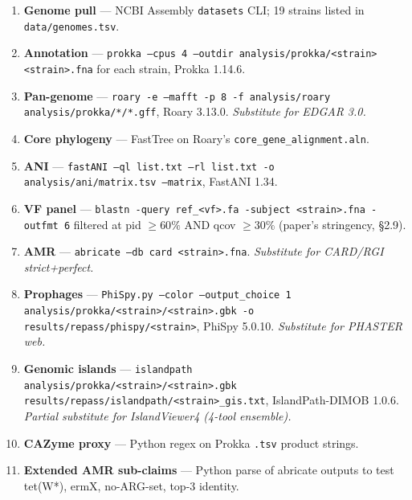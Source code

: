 \documentclass[11pt,a4paper]{article}
\begin{document}
\begin{enumerate}
\item \textbf{Genome pull} --- NCBI Assembly \texttt{datasets} CLI; 19 strains listed in \texttt{data/genomes.tsv}.
\item \textbf{Annotation} --- \texttt{prokka --cpus 4 --outdir analysis/prokka/<strain> <strain>.fna} for each strain, Prokka 1.14.6.
\item \textbf{Pan-genome} --- \texttt{roary -e --mafft -p 8 -f analysis/roary analysis/prokka/*/*.gff}, Roary 3.13.0. \emph{Substitute for EDGAR 3.0.}
\item \textbf{Core phylogeny} --- FastTree on Roary's \texttt{core\_gene\_alignment.aln}.
\item \textbf{ANI} --- \texttt{fastANI --ql list.txt --rl list.txt -o analysis/ani/matrix.tsv --matrix}, FastANI 1.34.
\item \textbf{VF panel} --- \texttt{blastn -query ref\_<vf>.fa -subject <strain>.fna -outfmt 6} filtered at pid $\geq 60\%$ AND qcov $\geq 30\%$ (paper's stringency, \S 2.9).
\item \textbf{AMR} --- \texttt{abricate --db card <strain>.fna}. \emph{Substitute for CARD/RGI strict+perfect.}
\item \textbf{Prophages} --- \texttt{PhiSpy.py --color --output\_choice 1 analysis/prokka/<strain>/<strain>.gbk -o results/repass/phispy/<strain>}, PhiSpy 5.0.10. \emph{Substitute for PHASTER web.}
\item \textbf{Genomic islands} --- \texttt{islandpath analysis/prokka/<strain>/<strain>.gbk results/repass/islandpath/<strain>\_gis.txt}, IslandPath-DIMOB 1.0.6. \emph{Partial substitute for IslandViewer4 (4-tool ensemble).}
\item \textbf{CAZyme proxy} --- Python regex on Prokka \texttt{.tsv} product strings.
\item \textbf{Extended AMR sub-claims} --- Python parse of abricate outputs to test tet(W*), ermX, no-ARG-set, top-3 identity.
\end{enumerate}
\end{document}
